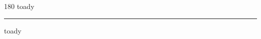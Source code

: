 
\begin{frame}
\begin{center}
\begin{turn}{180}
{\fontsize{2.5cm}{1em}\selectfont toady}
\end{turn}
\vspace{1em}\par  
\hrule
\vspace{1em}\par  
{\fontsize{2.5cm}{1em}\selectfont toady}
\end{center}
\end{frame}
